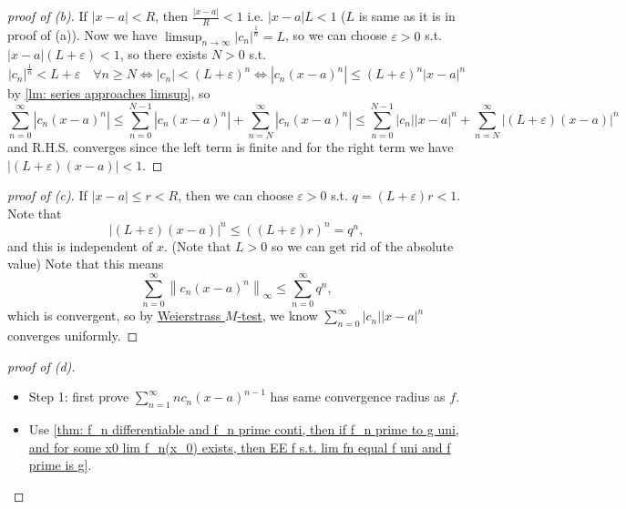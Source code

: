 \begin{proof}[proof of (b)]
    If \(\vert x - a \vert < R \), then \(\frac{\vert x - a \vert }{R} < 1\) i.e. \(\vert x - a \vert L < 1\) (\(L\) is same as it is in proof of (a)). Now we have 
    \(\limsup_{n \to \infty} \vert c_n \vert^{\frac{1}{n}} = L  \), so we can choose \(\varepsilon > 0\) s.t. \(\vert x - a \vert(L + \varepsilon ) < 1 \), so there exists \(N > 0\) s.t. 
    \[
        \left\vert c_n \right\vert^{\frac{1}{n}} < L + \varepsilon \quad \forall n \ge N \iff \vert c_n \vert < (L + \varepsilon )^n \iff \left\vert c_n (x-a)^n \right\vert \le (L + \varepsilon )^n \vert x - a \vert^n     
    \] by \autoref{lm: series approaches limsup}, so 
    \[
        \sum_{n=0}^{\infty} \left\vert c_n (x - a)^n \right\vert \le \sum_{n=0}^{N-1} \left\vert c_n (x-a)^n \right\vert + \sum_{n=N}^{\infty} \left\vert c_n(x-a)^n \right\vert \le \sum_{n=0}^{N-1} \vert c_n \vert \vert x-a \vert^n + \sum_{n=N}^{\infty} \left\vert (L+ \varepsilon )(x-a) \right\vert^n            
    \] and R.H.S. converges since the left term is finite and for the right term we have \(\vert (L + \varepsilon )(x - a) \vert < 1 \). 
\end{proof}

\begin{proof}[proof of (c)]
    If \(\vert x - a \vert \le r < R \), then we can choose \(\varepsilon > 0\) s.t. \(q = (L + \varepsilon )r < 1\). Note that 
    \[
        \left\vert (L + \varepsilon )(x - a) \right\vert^n \le \left( (L + \varepsilon )r \right)^n = q^n,  
    \] and this is independent of \(x\). (Note that \(L > 0\) so we can get rid of the absolute value) Note that this means
    \[
        \sum_{n=0}^{\infty} \left\lVert c_n(x-a)^n \right\rVert_\infty \le \sum_{n=0}^{\infty } q^n, 
    \] which is convergent, so by \hyperref[thm: Weierstrass M-test (bounded and conti)]{Weierstrass \(M\)-test}, we know \(\sum_{n=0}^{\infty} \vert c_n \vert \vert x - a \vert^n   \) converges uniformly.  
\end{proof}
\begin{proof}[proof of (d)]
    \vphantom{text}
    \begin{itemize}
        \item Step 1: first prove \(\sum_{n=1}^{\infty} n c_n (x-a)^{n-1} \) has same convergence radius as \(f\). 
        \item Use \autoref{thm: f_n differentiable and f_n prime conti, then if f_n prime to g uni, and for some x0 lim f_n(x_0) exists, then EE f s.t. lim fn equal f uni and f prime is g}.   
    \end{itemize}
\end{proof}